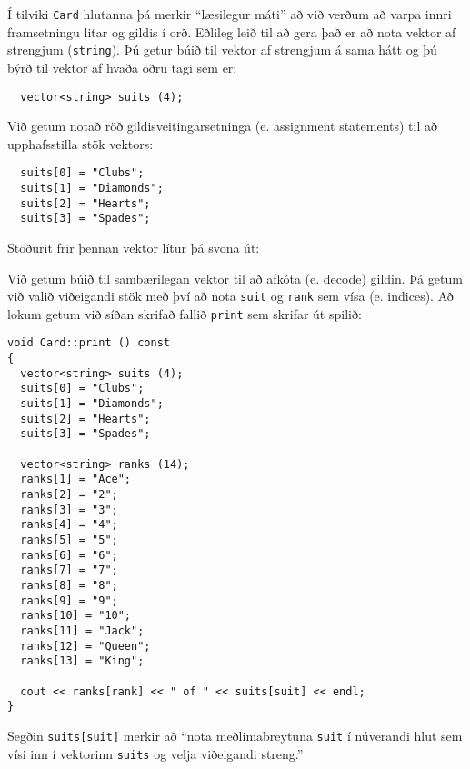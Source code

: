 
Í tilviki {\tt Card} hlutanna þá merkir ``læsilegur máti'' að við verðum að varpa innri framsetningu litar og gildis í orð.
Eðlileg leið til að gera það er að nota vektor af strengjum ({\tt string}).
Þú getur búið til vektor af strengjum á sama hátt og þú býrð til vektor af hvaða öðru tagi sem er:

\begin{verbatim}
  vector<string> suits (4);
\end{verbatim}
%

Við getum notað röð gildisveitingarsetninga (e. assignment statements) til að upphafsstilla stök vektors:

\begin{verbatim}
  suits[0] = "Clubs";
  suits[1] = "Diamonds";
  suits[2] = "Hearts";
  suits[3] = "Spades";
\end{verbatim}
%
Stöðurit frir þennan vektor lítur þá svona út: 


\vspace{0.1in}
\centerline{}
\vspace{0.1in}

Við getum búið til sambærilegan vektor til að afkóta (e. decode) gildin.
Þá getum við valið viðeigandi stök með því að nota {\tt suit} og {\tt rank} sem vísa (e. indices).
Að lokum getum við síðan skrifað fallið {\tt print} sem skrifar út spilið:

\begin{verbatim}
void Card::print () const
{
  vector<string> suits (4);
  suits[0] = "Clubs";
  suits[1] = "Diamonds";
  suits[2] = "Hearts";
  suits[3] = "Spades";

  vector<string> ranks (14);
  ranks[1] = "Ace";
  ranks[2] = "2";
  ranks[3] = "3";
  ranks[4] = "4";
  ranks[5] = "5";
  ranks[6] = "6";
  ranks[7] = "7";
  ranks[8] = "8";
  ranks[9] = "9";
  ranks[10] = "10";
  ranks[11] = "Jack";
  ranks[12] = "Queen";
  ranks[13] = "King";

  cout << ranks[rank] << " of " << suits[suit] << endl;
}
\end{verbatim}
%
Segðin {\tt suits[suit]} merkir að ``nota meðlimabreytuna {\tt suit} í núverandi hlut sem vísi inn í vektorinn {\tt suits}
og velja viðeigandi streng.''

